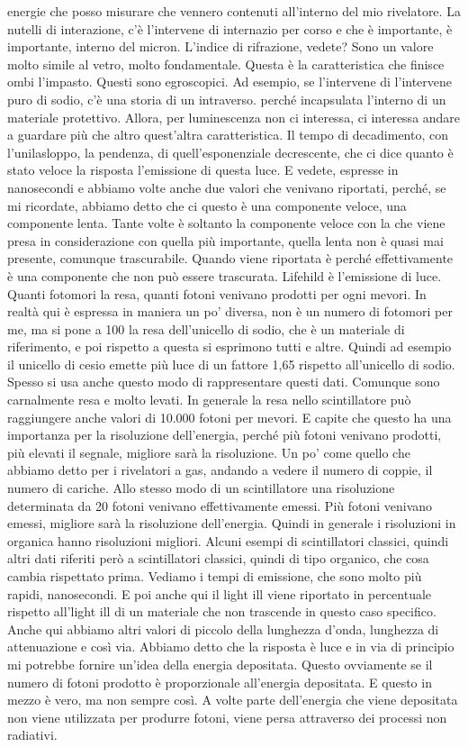 {energie che posso misurare che vennero contenuti all'interno del mio rivelatore. La nutelli di interazione, c'è l'intervene di internazio per corso e che è importante, è importante, interno del micron. L'indice di rifrazione, vedete? Sono un valore molto simile al vetro, molto fondamentale. Questa è la caratteristica che finisce ombi l'impasto. Questi sono egroscopici. Ad esempio, se l'intervene di l'intervene puro di sodio, c'è una storia di un intraverso. perché incapsulata l'interno di un materiale protettivo. Allora, per luminescenza non ci interessa, ci interessa andare a guardare più che altro quest'altra caratteristica. Il tempo di decadimento, con l'unilasloppo, la pendenza, di quell'esponenziale decrescente, che ci dice quanto è stato veloce la risposta l'emissione di questa luce. E vedete, espresse in nanosecondi e abbiamo volte anche due valori che venivano riportati, perché, se mi ricordate, abbiamo detto che ci questo è una componente veloce, una componente lenta. Tante volte è soltanto la componente veloce con la che viene presa in considerazione con quella più importante, quella lenta non è quasi mai presente, comunque trascurabile. Quando viene riportata è perché effettivamente è una componente che non può essere trascurata. Lifehild è l'emissione di luce. Quanti fotomori la resa, quanti fotoni venivano prodotti per ogni mevori. In realtà qui è espressa in maniera un po' diversa, non è un numero di fotomori per me, ma si pone a 100 la resa dell'unicello di sodio, che è un materiale di riferimento, e poi rispetto a questa si esprimono tutti e altre. Quindi ad esempio il unicello di cesio emette più luce di un fattore 1,65 rispetto all'unicello di sodio. Spesso si usa anche questo modo di rappresentare questi dati. Comunque sono carnalmente resa e molto levati. In generale la resa nello scintillatore può raggiungere anche valori di 10.000 fotoni per mevori. E capite che questo ha una importanza per la risoluzione dell'energia, perché più fotoni venivano prodotti, più elevati il segnale, migliore sarà la risoluzione. Un po' come quello che abbiamo detto per i rivelatori a gas, andando a vedere il numero di coppie, il numero di cariche. Allo stesso modo di un scintillatore una risoluzione determinata da 20 fotoni venivano effettivamente emessi. Più fotoni venivano emessi, migliore sarà la risoluzione dell'energia. Quindi in generale i risoluzioni in organica hanno risoluzioni migliori. Alcuni esempi di scintillatori classici, quindi altri dati riferiti però a scintillatori classici, quindi di tipo organico, che cosa cambia rispettato prima. Vediamo i tempi di emissione, che sono molto più rapidi, nanosecondi. E poi anche qui il light ill viene riportato in percentuale rispetto all'light ill di un materiale che non trascende in questo caso specifico. Anche qui abbiamo altri valori di piccolo della lunghezza d'onda, lunghezza di attenuazione e così via. Abbiamo detto che la risposta è luce e in via di principio mi potrebbe fornire un'idea della energia depositata. Questo ovviamente se il numero di fotoni prodotto è proporzionale all'energia depositata. E questo in mezzo è vero, ma non sempre così. A volte parte dell'energia che viene depositata non viene utilizzata per produrre fotoni, viene persa attraverso dei processi non radiativi.

}
